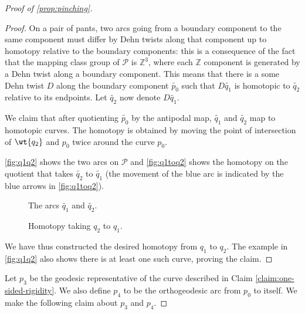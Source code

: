 \documentclass[12pt, reqno]{amsart}
\begin{document}
\begin{proof}[Proof of \autoref{prop:pinching}]
\begin{proof}
    On a pair of pants, two arcs going from a boundary component to the same component must differ by Dehn twists along that component up to homotopy relative to the boundary components: this is a consequence of the fact that the mapping class group of $\mathcal{P}$ is $\mathbb{Z}^3$, where each $\mathbb{Z}$ component is generated by a Dehn twist along a boundary component.
    This means that there is a some Dehn twist $D$ along the boundary component $\widetilde{p_0}$ such that $D\widetilde{q_1}$ is homotopic to $\widetilde{q_2}$ relative to its endpoints. Let $\widetilde{q_2}$ now denote $D\widetilde{q_1}$.

    We claim that after quotienting $\widetilde{p_0}$ by the antipodal map, $\widetilde{q_1}$ and $\widetilde{q_2}$ map to homotopic curves.
    The homotopy is obtained by moving the point of intersection of $\wt{q_2}$ and $p_0$ twice around the curve $p_0$.

    \autoref{fig:q1q2} shows the two arcs on $\mathcal{P}$ and \autoref{fig:q1toq2} shows the homotopy on the quotient that takes $\widetilde{q_2}$ to $\widetilde{q_1}$ (the movement of the blue arc is indicated by the blue arrows in \autoref{fig:q1toq2}).
    \begin{figure}[h]
      \centering
      \caption{The arcs $\widetilde{q_1}$ and $\widetilde{q_2}$.}
      \label{fig:q1q2}
    \end{figure}

    \begin{figure}[h]
      \centering
      \caption{Homotopy taking $q_2$ to $q_1$.}
      \label{fig:q1toq2}
    \end{figure}

    We have thus constructed the desired homotopy from $q_1$ to $q_2$.
    The example in \autoref{fig:q1q2} also shows there is at least one such curve, proving the claim.
  \end{proof}

  Let $p_3$ be the geodesic representative of the curve described in Claim \ref{claim:one-sided-rigidity}.
  We also define $p_4$ to be the orthogeodesic arc from $p_0$ to itself.
  We make the following claim about $p_3$ and $p_4$.


\end{proof}
\end{document}
